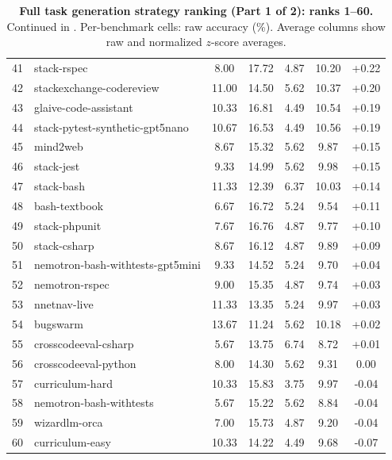\documentclass{article}
\begin{document}
\begin{table}[!htbp]
\begin{tabular}{rlccccc}
41 & stack-rspec                    &  8.00 & 17.72 &  4.87 & 10.20 & +0.22 \\
42 & stackexchange-codereview       & 11.00 & 14.50 &  5.62 & 10.37 & +0.20 \\
43 & glaive-code-assistant          & 10.33 & 16.81 &  4.49 & 10.54 & +0.19 \\
44 & stack-pytest-synthetic-gpt5nano & 10.67 & 16.53 &  4.49 & 10.56 & +0.19 \\
45 & mind2web                       &  8.67 & 15.32 &  5.62 &  9.87 & +0.15 \\
46 & stack-jest                     &  9.33 & 14.99 &  5.62 &  9.98 & +0.15 \\
47 & stack-bash                     & 11.33 & 12.39 &  6.37 & 10.03 & +0.14 \\
48 & bash-textbook                  &  6.67 & 16.72 &  5.24 &  9.54 & +0.11 \\
49 & stack-phpunit                  &  7.67 & 16.76 &  4.87 &  9.77 & +0.10 \\
50 & stack-csharp                   &  8.67 & 16.12 &  4.87 &  9.89 & +0.09 \\
51 & nemotron-bash-withtests-gpt5mini &  9.33 & 14.52 & 5.24 & 9.70 & +0.04 \\
52 & nemotron-rspec                 &  9.00 & 15.35 &  4.87 &  9.74 & +0.03 \\
53 & nnetnav-live                   & 11.33 & 13.35 &  5.24 &  9.97 & +0.03 \\
54 & bugswarm                       & 13.67 & 11.24 &  5.62 & 10.18 & +0.02 \\
55 & crosscodeeval-csharp           &  5.67 & 13.75 &  6.74 &  8.72 & +0.01 \\
56 & crosscodeeval-python           &  8.00 & 14.30 &  5.62 &  9.31 &  0.00 \\
57 & curriculum-hard                & 10.33 & 15.83 &  3.75 &  9.97 & -0.04 \\
58 & nemotron-bash-withtests        &  5.67 & 15.22 &  5.62 &  8.84 & -0.04 \\
59 & wizardlm-orca                  &  7.00 & 15.73 &  4.87 &  9.20 & -0.04 \\
60 & curriculum-easy                & 10.33 & 14.22 &  4.49 &  9.68 & -0.07 \\
\bottomrule
\end{tabular}
\vspace{10pt}
\caption{\textbf{Full task generation strategy ranking (Part 1 of 2): ranks 1--60.} Continued in . Per-benchmark cells: raw accuracy (\%). Average columns show raw and normalized $z$-score averages.}
\label{tab:task_gen_full_part1}
\end{table}
\FloatBarrier
\end{document}
